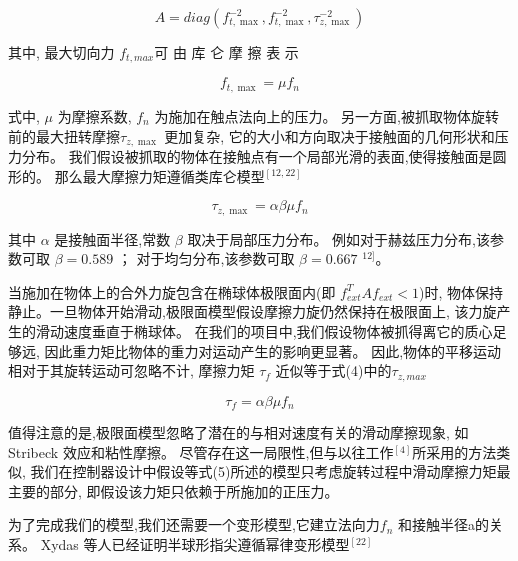 \vspace{-15pt}
\begin{equation}
  A = diag\left( {f_{t,\max }^{ - 2},f_{t,\max }^{ - 2},\tau _{z,\max }^{ - 2}} \right)
\end{equation}

\noindent 其中, 最大切向力 $f_{t,max}$可 由 库 仑 摩 擦 表 示

\vspace{-15pt}
\begin{equation}
  {f_{t,\max }} = \mu {f_n}
\end{equation}

\noindent 式中, $\mu$ 为摩擦系数, $f_n$ 为施加在触点法向上的压力。
另一方面,被抓取物体旋转前的最大扭转摩擦${\tau _{z,\max }}$  更加复杂,
它的大小和方向取决于接触面的几何形状和压力分布。
我们假设被抓取的物体在接触点有一个局部光滑的表面,使得接触面是圆形的。
那么最大摩擦力矩遵循类库仑模型$^{[12, 22]}$

\vspace{-15pt}
\begin{equation}
  {\tau _{z,\max }} = \alpha \beta \mu {f_n}
\end{equation}

其中 $\alpha$ 是接触面半径,常数 $\beta$ 取决于局部压力分布。
例如对于赫兹压力分布,该参数可取 $\beta = 0.589$ ；
对于均匀分布,该参数可取 $\beta= 0.667$ $^{12]}$。

当施加在物体上的合外力旋包含在椭球体极限面内(即 $f_{ext}^TA{f_{ext}} < 1$)时,
物体保持静止。一旦物体开始滑动,极限面模型假设摩擦力旋仍然保持在极限面上,
该力旋产生的滑动速度垂直于椭球体。
在我们的项目中,我们假设物体被抓得离它的质心足够远,
因此重力矩比物体的重力对运动产生的影响更显著。
因此,物体的平移运动相对于其旋转运动可忽略不计,
摩擦力矩 $\tau_f$ 近似等于式(4)中的$\tau_{z,max}$

\vspace{-15pt}
\begin{equation}
  {\tau _f} = \alpha \beta \mu {f_n}
\end{equation}

值得注意的是,极限面模型忽略了潜在的与相对速度有关的滑动摩擦现象,
如 Stribeck 效应和粘性摩擦。
尽管存在这一局限性,但与以往工作$^{[4]}$所采用的方法类似,
我们在控制器设计中假设等式(5)所述的模型只考虑旋转过程中滑动摩擦力矩最主要的部分,
即假设该力矩只依赖于所施加的正压力。


为了完成我们的模型,我们还需要一个变形模型,它建立法向力$f_n$ 和接触半径a的关系。
Xydas 等人已经证明半球形指尖遵循幂律变形模型$^{[22]}$

